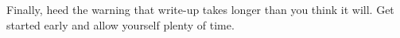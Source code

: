 \documentclass[11pt,preprint]{aastex}
\begin{document}
Finally, heed the warning that write-up takes longer than you think it will. Get
started early and allow yourself plenty of time.

%
%
%
%
%
\end{document}
